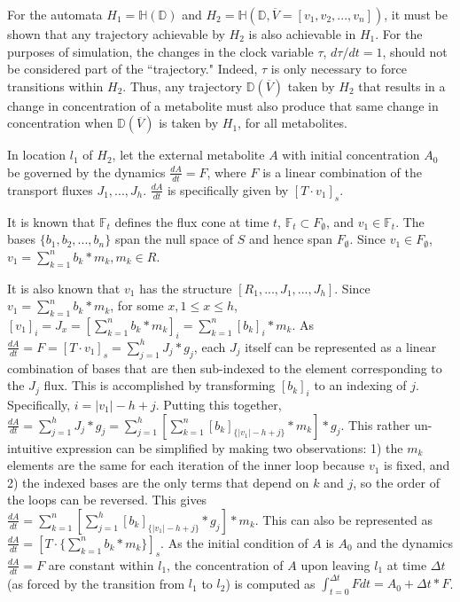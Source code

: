 
For the automata $H_1 = \mathbb{H}(\mathbb{D})$ and $H_2 = \mathbb{H}(\mathbb{D},\overline{V} = [v_1, v_2, ..., v_n])$, it must be shown that any trajectory achievable by $H_2$ is also achievable in $H_1$. For the purposes of simulation, the changes in the clock variable $\tau$, $d\tau / dt = 1$, should not be considered part of the ``trajectory." Indeed, $\tau$ is only necessary to force transitions within $H_2$. Thus, any trajectory $\mathbb{D}(\overline{V})$ taken by $H_2$ that results in a change in concentration of a metabolite must also produce that same change in concentration when $\mathbb{D}(\overline{V})$ is taken by $H_1$, for all metabolites.

In location $l_1$ of $H_2$, let the external metabolite $A$ with initial concentration $A_0$ be governed by the dynamics $\frac{dA}{dt} = F$, where $F$ is a linear combination of the transport fluxes $J_1, ..., J_h$. $\frac{dA}{dt}$ is specifically given by $[T \cdot v_1]_s$. %

It is known that $\mathbb{F}_t$ defines the flux cone at time $t$, $\mathbb{F}_t \subset F_{\emptyset}$, and $v_1 \in \mathbb{F}_t$. The bases $\{ b_1, b_2, ..., b_n \}$ span the null space of $S$ and hence span $F_{\emptyset}$. Since $v_1 \in F_{\emptyset}$, $v_1 = \sum^{n}_{k=1} b_{k} * m_k, m_k \in R$.

It is also known that $v_1$ has the structure $[R_1, ...,  J_1, ..., J_h]$. Since $v_1 = \sum^{n}_{k=1} b_{k} * m_k$, for some $x, 1 \leq x \leq h$, $[v_1]_i = J_x = [\sum^{n}_{k=1} b_{k} * m_k]_i = \sum^{n}_{k=1} [b_{k}]_i * m_k$.  As $\frac{dA}{dt} = F = [T \cdot v_1]_s = \sum^h_{j=1} J_j * g_j$, each $J_j$ itself can be represented as a linear combination of bases that are then sub-indexed to the element corresponding to the $J_j$ flux. This is accomplished by transforming $[b_k]_i$ to an indexing of $j$. Specifically, $i = |v_1| - h + j$. Putting this together, $\frac{dA}{dt} = \sum^h_{j=1} J_j * g_j = \sum^h_{j=1} [\sum^{n}_{k=1} [b_{k}]_{\{|v_1|-h+j\}} * m_k] * g_j$. This rather un-intuitive expression can be simplified by making two observations: 1) the $m_k$ elements are the same for each iteration of the inner loop because $v_1$ is fixed, and 2) the indexed bases are the only terms that depend on $k$ and $j$, so the order of the loops can be reversed. This gives $\frac{dA}{dt} = \sum^{n}_{k=1} [\sum^h_{j=1} [b_{k}]_{\{|v_1|-h+j\}} * g_j] * m_k$. This can also be represented as $\frac{dA}{dt} = [T \cdot  \{\sum^{n}_{k=1} b_{k} * m_k\}]_s$.
As the initial condition of $A$ is $A_0$ and the dynamics $\frac{dA}{dt} = F$ are constant within $l_1$, the concentration of $A$ upon leaving $l_1$ at time $\Delta t$ (as forced by the transition from $l_1$ to $l_2$) is computed as $\int^{\Delta t}_{t = 0} F dt = A_0 + \Delta t * F$.\\

